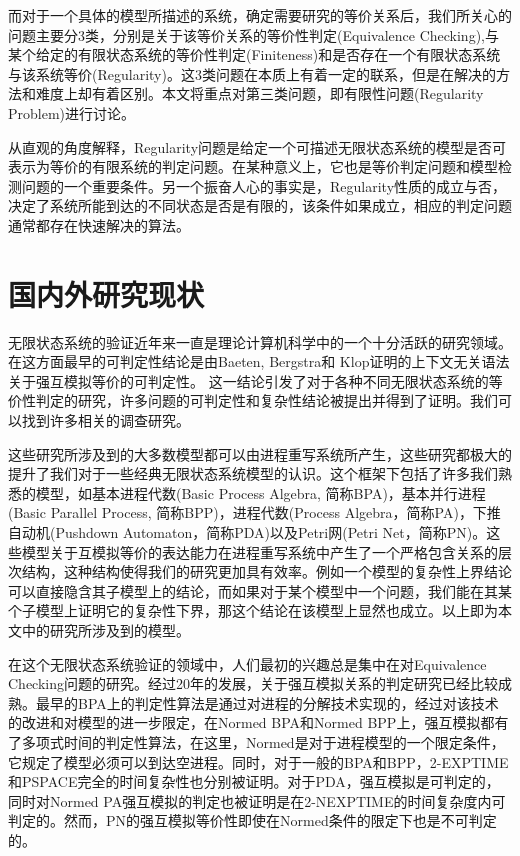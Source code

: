 而对于一个具体的模型所描述的系统，确定需要研究的等价关系后，我们所关心的问题主要分3类，分别是关于该等价关系的等价性判定(Equivalence Checking),与某个给定的有限状态系统的等价性判定(Finiteness)和是否存在一个有限状态系统与该系统等价(Regularity)。这3类问题在本质上有着一定的联系，但是在解决的方法和难度上却有着区别。本文将重点对第三类问题，即有限性问题(Regularity Problem)进行讨论。

从直观的角度解释，Regularity问题是给定一个可描述无限状态系统的模型是否可表示为等价的有限系统的判定问题。在某种意义上，它也是等价判定问题和模型检测问题的一个重要条件。另一个振奋人心的事实是，Regularity性质的成立与否，决定了系统所能到达的不同状态是否是有限的，该条件如果成立，相应的判定问题通常都存在快速解决的算法。

\section{国内外研究现状}
\label{sec:state-of-the-art}

无限状态系统的验证近年来一直是理论计算机科学中的一个十分活跃的研究领域。在这方面最早的可判定性结论是由Baeten, Bergstra和 Klop证明的上下文无关语法关于强互模拟等价的可判定性\cite{Baeten1993}。 这一结论引发了对于各种不同无限状态系统的等价性判定的研究，许多问题的可判定性和复杂性结论被提出并得到了证明。我们可以找到许多相关的调查研究\cite{Burkart2001, Kucera2006, Moller2004, Srba2002}。

这些研究所涉及到的大多数模型都可以由进程重写系统所产生\cite{Mayr2000}，这些研究都极大的提升了我们对于一些经典无限状态系统模型的认识。这个框架下包括了许多我们熟悉的模型，如基本进程代数(Basic Process Algebra, 简称BPA)\cite{Bergstra1985}，基本并行进程(Basic Parallel Process, 简称BPP)\cite{Christensen1993}，进程代数(Process Algebra，简称PA)\cite{Baeten1990}，下推自动机(Pushdown Automaton，简称PDA)\cite{Hopcroft1979}以及Petri网(Petri Net，简称PN)\cite{Peterson1977}。这些模型关于互模拟等价的表达能力在进程重写系统中产生了一个严格包含关系的层次结构，这种结构使得我们的研究更加具有效率。例如一个模型的复杂性上界结论可以直接隐含其子模型上的结论，而如果对于某个模型中一个问题，我们能在其某个子模型上证明它的复杂性下界，那这个结论在该模型上显然也成立。以上即为本文中的研究所涉及到的模型。

在这个无限状态系统验证的领域中，人们最初的兴趣总是集中在对Equivalence Checking问题的研究。经过20年的发展，关于强互模拟关系的判定研究已经比较成熟。最早的BPA上的判定性算法是通过对进程的分解技术实现的\cite{Baeten1993,Christensen1992}，经过对该技术的改进和对模型的进一步限定，在Normed BPA和Normed BPP上，强互模拟都有了多项式时间的判定性算法\cite{Hirshfeld,Hirshfelda}，在这里，Normed是对于进程模型的一个限定条件，它规定了模型必须可以到达空进程。同时，对于一般的BPA和BPP，2-EXPTIME和PSPACE完全的时间复杂性也分别被证明\cite{Burkart1995,Jancar2012,Jancar2003}。对于PDA，强互模拟是可判定的\cite{Senizergues1998,Stirling1998}，同时对Normed PA强互模拟的判定也被证明是在2-NEXPTIME的时间复杂度内可判定的\cite{Hirshfeldb}。然而，PN的强互模拟等价性即使在Normed条件的限定下也是不可判定的\cite{Jancar1995}。 

